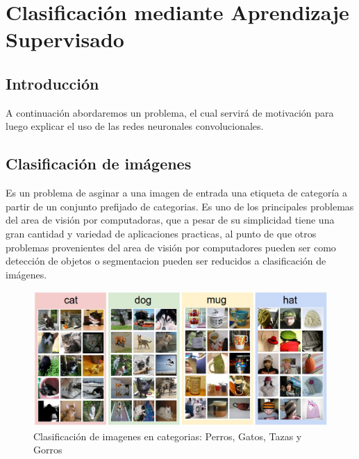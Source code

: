 \documentclass[a4paper,11pt,spanish]{book}
\begin{document}
    
    \section{Clasificación mediante Aprendizaje Supervisado}
      \subsection{Introducción}
	A continuación abordaremos un problema, el cual servirá de motivación para luego explicar el uso de las redes neuronales convolucionales.

      \subsection{Clasificación de imágenes}
	Es un problema de asginar a una imagen de entrada una etiqueta de categoría a partir de un conjunto prefijado de categorias.
	Es uno de los principales problemas del area de visión por computadoras, que a pesar de su simplicidad tiene una gran cantidad y variedad de aplicaciones practicas, 
	al punto de que otros problemas provenientes del area de visión por computadores pueden ser como detección de objetos o segmentacion pueden ser reducidos a clasificación de imágenes.
	\begin{figure}[h]
	  \includegraphics[scale=0.5]{./img/stanford_img_class.jpg}
	  \caption{Clasificación de imagenes en categorias: Perros, Gatos, Tazas y Gorros}
	  \label{fig:stanford_img_class}
	\end{figure}
\end{document}
